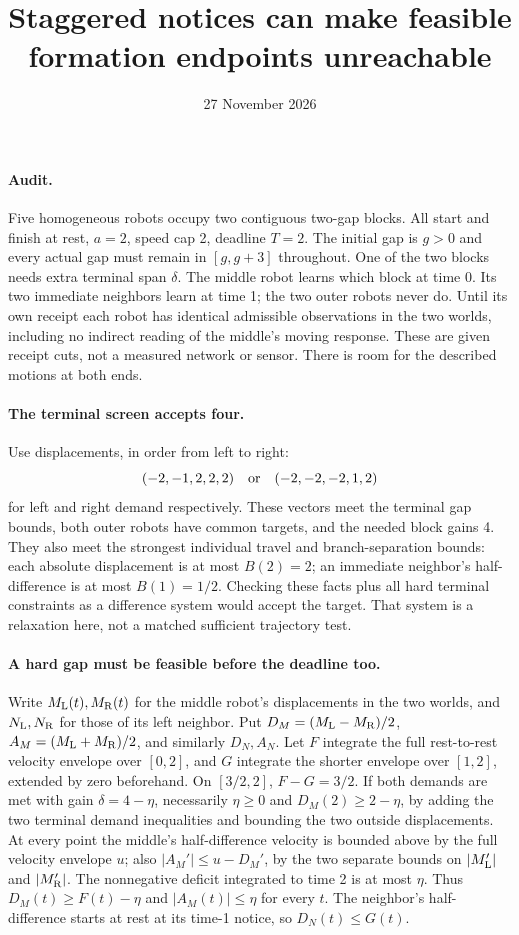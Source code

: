 \documentclass[11pt]{article}
\title{Staggered notices can make feasible formation endpoints unreachable}
\date{27 November 2026}
\begin{document}
\maketitle
\paragraph{Audit.}
Five homogeneous robots occupy two contiguous two-gap blocks.
All start and finish at rest, \(a=2\), speed cap 2, deadline
\(T=2\). The initial gap is \(g>0\) and every actual gap must
remain in \([g,g+3]\) throughout. One of the two blocks needs
extra terminal span \(\delta\). The middle robot learns which
block at time 0. Its two immediate neighbors learn at time 1;
the two outer robots never do. Until its own receipt each
robot has identical admissible observations in the two worlds,
including no indirect reading of the middle's moving response.
These are given receipt cuts, not a measured network or sensor.
There is room for the described motions at both ends.

\paragraph{The terminal screen accepts four.}
Use displacements, in order from left to right:
\[
       (-2,-1,2,2,2)\quad\hbox{or}\quad(-2,-2,-2,1,2)
\]
for left and right demand respectively. These vectors meet the
terminal gap bounds, both outer robots have common targets, and
the needed block gains 4. They also meet the strongest individual
travel and branch-separation bounds: each absolute displacement
is at most \(B(2)=2\); an immediate neighbor's half-difference is
at most \(B(1)=1/2\). Checking these facts plus all hard terminal
constraints as a difference system would accept the target.
That system is a relaxation here, not a matched sufficient
trajectory test.

\paragraph{A hard gap must be feasible before the deadline too.}
Write \(M_{\rm L}(t),M_{\rm R}(t)\) for the middle robot's
displacements in the two worlds, and \(N_{\rm L},N_{\rm R}\)
for those of its left neighbor. Put
\(D_M=(M_{\rm L}-M_{\rm R})/2\), \(A_M=(M_{\rm L}+M_{\rm R})/2\),
and similarly \(D_N,A_N\).
Let \(F\) integrate the full rest-to-rest velocity envelope
over \([0,2]\), and \(G\) integrate the shorter envelope over
\([1,2]\), extended by zero beforehand. On \([3/2,2]\),
\(F-G=3/2\). If both demands are met with gain
\(\delta=4-\eta\), necessarily \(\eta\ge0\) and
\(D_M(2)\ge 2-\eta\), by adding the two terminal demand
inequalities and bounding the two outside displacements.
At every point the middle's half-difference velocity is
bounded above by the full velocity envelope \(u\);
also \(|A_M'|\le u-D_M'\), by the two separate bounds
on \(|M_{\rm L}'|\) and \(|M_{\rm R}'|\).
The nonnegative deficit integrated to time 2 is at most
\(\eta\). Thus \(D_M(t)\ge F(t)-\eta\) and
\(|A_M(t)|\le\eta\) for every \(t\).
The neighbor's half-difference starts at rest at its
time-1 notice, so \(D_N(t)\le G(t)\).
\end{document}
